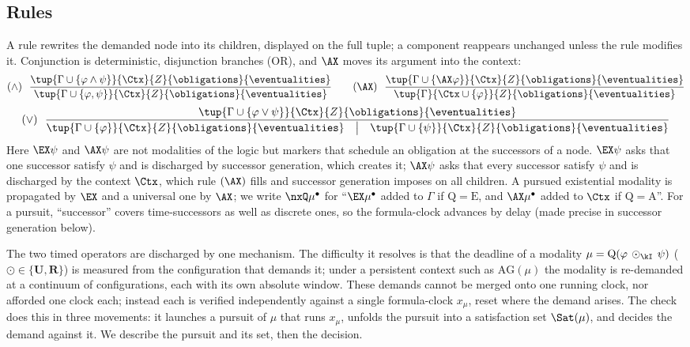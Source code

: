 \subsection{Rules}\label{ss:rules}

A rule rewrites the demanded node into its children, displayed on the full tuple; a component reappears
unchanged unless the rule modifies it. Conjunction is deterministic, disjunction branches (OR), and $\AX$
moves its argument into the context:
\[
(\wedge)\ \ \frac{\tup{\Gamma\cup\{\varphi\land\psi\}}{\Ctx}{Z}{\obligations}{\eventualities}}
{\tup{\Gamma\cup\{\varphi,\psi\}}{\Ctx}{Z}{\obligations}{\eventualities}}
\qquad
(\AX)\ \ \frac{\tup{\Gamma\cup\{\AX\varphi\}}{\Ctx}{Z}{\obligations}{\eventualities}}
{\tup{\Gamma}{\Ctx\cup\{\varphi\}}{Z}{\obligations}{\eventualities}}
\]
\[
(\vee)\ \ \frac{\tup{\Gamma\cup\{\varphi\lor\psi\}}{\Ctx}{Z}{\obligations}{\eventualities}}
{\tup{\Gamma\cup\{\varphi\}}{\Ctx}{Z}{\obligations}{\eventualities}\quad\big|\quad
\tup{\Gamma\cup\{\psi\}}{\Ctx}{Z}{\obligations}{\eventualities}}
\]
Here $\EX\psi$ and $\AX\psi$ are not modalities of the logic but {markers} that schedule an obligation at
the successors of a node. $\EX\psi$ asks that {one} successor satisfy $\psi$ and is discharged by
successor generation, which creates it; $\AX\psi$ asks that {every} successor satisfy $\psi$ and is
discharged by the context $\Ctx$, which rule $(\AX)$ fills and successor generation imposes on all children.
A pursued existential modality is propagated by $\EX$ and a universal one by $\AX$; we write $\nxQ\mu^\bullet$
for ``$\EX\mu^\bullet$ added to $\Gamma$ if $\mathrm{Q}=\mathrm{E}$, and $\AX\mu^\bullet$ added to $\Ctx$ if
$\mathrm{Q}=\mathrm{A}$''. For a pursuit, ``successor'' covers time-successors as well as discrete ones, so
the formula-clock advances by delay (made precise in successor generation below).

The two timed operators are discharged by one mechanism. The difficulty it resolves is that the deadline of a
modality $\mu=\mathrm{Q}(\varphi\,\odot_\kI\,\psi)$ ($\odot\in\{\mathbf{U},\mathbf{R}\}$) is measured {from
the configuration that demands it}; under a persistent context such as $\mathrm{AG}(\mu)$ the modality is
re-demanded at a {continuum} of configurations, each with its own absolute window. These demands cannot
be merged onto one running clock, nor afforded one clock each; instead each is verified {independently}
against a single formula-clock $x_\mu$, reset where the demand arises. The check does this in three movements:
it {launches} a pursuit of $\mu$ that runs $x_\mu$, {unfolds} the pursuit into a satisfaction set
$\Sat(\mu)$, and {decides} the demand against it. We describe the pursuit and its set, then the decision.

